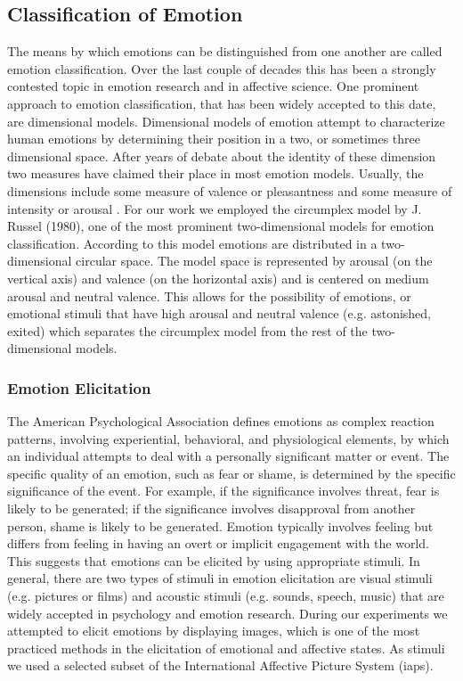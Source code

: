 \subsection{Classification of Emotion}\label{emoclass}
The means by which emotions can be distinguished from one another are called emotion classification. Over the last couple of decades this has been a strongly contested topic in emotion research and in affective science. One prominent approach to emotion classification, that has been widely accepted to this date, are dimensional models. Dimensional models of emotion attempt to characterize human emotions by determining their position in a two, or sometimes three dimensional space. After years of debate about the identity of these dimension two measures have claimed their place in most emotion models. Usually, the dimensions include some measure of valence or pleasantness and some measure of intensity or arousal \cite{Rubin2009}. For our work we employed the circumplex model by J. Russel (1980), one of the most prominent two-dimensional models for emotion classification. According to this model emotions are distributed in a two-dimensional circular space. The model space is represented by arousal (on the vertical axis) and valence (on the horizontal axis) and is centered on medium arousal and neutral valence. This allows for the possibility of emotions, or emotional stimuli that have high arousal and neutral valence (e.g. astonished, exited) \cite{Rubin2009} which separates the circumplex model from the rest of the two-dimensional models.

\subsubsection{Emotion Elicitation}
The American Psychological Association defines emotions as complex reaction patterns, involving experiential, behavioral, and physiological elements, by which an individual attempts to deal with a personally significant matter or event. The specific quality of an emotion, such as fear or shame, is determined by the specific significance of the event. For example, if the significance involves threat, fear is likely to be generated; if the significance involves disapproval from another person, shame is likely to be generated. Emotion typically involves feeling but differs from feeling in having an overt or implicit engagement with the world. This suggests that emotions can be elicited by using appropriate stimuli. In general, there are two types of stimuli in emotion elicitation are visual stimuli (e.g. pictures or films) and acoustic stimuli (e.g. sounds, speech, music) that are widely accepted in psychology and emotion research. During our experiments we attempted to elicit emotions by displaying images, which is one of the most practiced methods in the elicitation of emotional and affective states. As stimuli we used a selected subset of the International Affective Picture System (\gls{iaps}).


